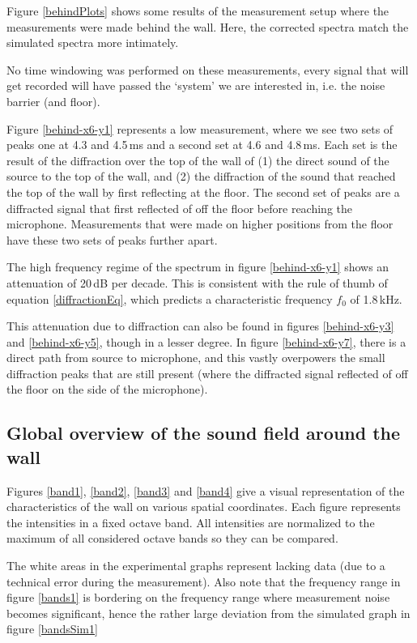 Figure \ref{behindPlots} shows some results of the measurement setup where the measurements were made behind the wall. Here, the corrected spectra match the simulated spectra more intimately.

No time windowing was performed on these measurements, every signal that will get recorded will have passed the `system' we are interested in, i.e. the noise barrier (and floor). 

Figure \ref{behind-x6-y1} represents a low measurement, where we see two sets of peaks one at 4.3 and 4.5\,ms and a second set at 4.6 and 4.8\,ms. Each set is the result of the diffraction over the top of the wall of (1) the direct sound of the source to the top of the wall, and (2) the diffraction of the sound that reached the top of the wall by first reflecting at the floor. The second set of peaks are a diffracted signal that first reflected of off the floor before reaching the microphone. Measurements that were made on higher positions from the floor have these two sets of peaks further apart.


The high frequency regime of the spectrum in figure \ref{behind-x6-y1} shows an attenuation of 20\,dB per decade. This is consistent with the rule of thumb of equation \ref{diffractionEq}, which predicts a characteristic frequency $f_0$ of 1.8\,kHz.

This attenuation due to diffraction can also be found in figures \ref{behind-x6-y3} and \ref{behind-x6-y5}, though in a lesser degree. In figure \ref{behind-x6-y7}, there is a direct path from source to microphone, and this vastly overpowers the small diffraction peaks that are still present (where the diffracted signal reflected of off the floor on the side of the microphone).



\subsection{Global overview of the sound field around the wall}
Figures \ref{band1}, \ref{band2}, \ref{band3} and \ref{band4} give a visual representation of the characteristics of the wall on various spatial coordinates. Each figure represents the intensities in a fixed octave band. All intensities are normalized to the maximum of all considered octave bands so they can be compared.

The white areas in the experimental graphs represent lacking data (due to a technical error during the measurement). Also note that the frequency range in figure \ref{bands1} is bordering on the frequency range where measurement noise becomes significant, hence the rather large deviation from the simulated graph in figure \ref{bandsSim1}


